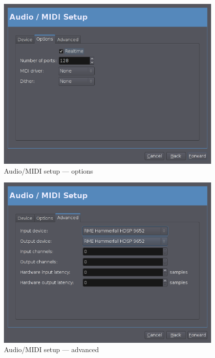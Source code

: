 \documentclass{book}
\begin{document}
\begin{figure}[ht]
\begin{center}
\includegraphics[scale=0.5]{screenshots/audio-midi-setup-options.png}
\end{center}
\caption{Audio/MIDI setup --- options}
\label{fig:audio-midi-setup-options}
\end{figure}

\begin{figure}[ht]
\begin{center}
\includegraphics[scale=0.5]{screenshots/audio-midi-setup-advanced.png}
\end{center}
\caption{Audio/MIDI setup --- advanced}
\label{fig:audio-midi-setup-advanced}
\end{figure}
\end{document}
